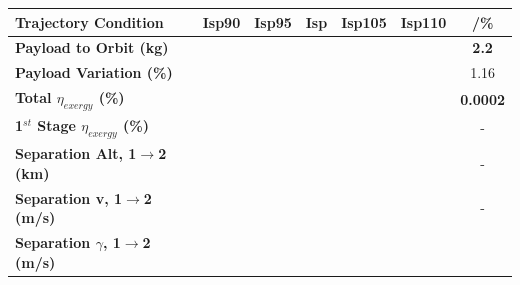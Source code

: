 \begin{table}[ht!]
	\centering
	\begin{tabular}{l c c c c c c} 
		\hline \textbf{Trajectory Condition}
		&Isp90
		&Isp95
		&Isp
		&Isp105
		&Isp110
		& /\%
		\\
		\hline \textbf{Payload to Orbit (kg)}
		& \textbf{\PayloadToOrbitIspNinetyNoReturn}
		& \textbf{\PayloadToOrbitIspNinetyFiveNoReturn}
		& \textbf{\PayloadToOrbitIspStandardNoReturn}
		& \textbf{\PayloadToOrbitIspOneHundredFiveNoReturn}
		& \textbf{\PayloadToOrbitIspOneHundredTenNoReturn}
		&\textbf{2.2}
		\\
		\textbf{Payload Variation (\%)}
		& \PayloadVarIspNinetyNoReturn
		& \PayloadVarIspNinetyFiveNoReturn
		& \PayloadVarIspStandardNoReturn
		& \PayloadVarIspOneHundredFiveNoReturn
		& \PayloadVarIspOneHundredTenNoReturn
		&1.16
		\\
		\textbf{Total $\eta_{exergy}$ (\%)}
		& \textbf{\totalExergyEffIspNinetyNoReturn}
		& \textbf{\totalExergyEffIspNinetyFiveNoReturn}
		& \textbf{\totalExergyEffIspStandardNoReturn}
		& \textbf{\totalExergyEffIspOneHundredFiveNoReturn}
		& \textbf{\totalExergyEffIspOneHundredTenNoReturn}
		& \textbf{0.0002}
		\\
		\hline 
		\textbf{1$^{st}$ Stage $\eta_{exergy}$ (\%)}
		& \textbf{\firstExergyEffIspNinetyNoReturn}
		& \textbf{\firstExergyEffIspNinetyFiveNoReturn}
		& \textbf{\firstExergyEffIspStandardNoReturn}
		& \textbf{\firstExergyEffIspOneHundredFiveNoReturn}
		& \textbf{\firstExergyEffIspOneHundredTenNoReturn}
		& -
		\\
		\textbf{Separation Alt, 1$\rightarrow$2 (km)}
		& \firstsecondSeparationAltIspNinetyNoReturn
		& \firstsecondSeparationAltIspNinetyFiveNoReturn
		& \firstsecondSeparationAltIspStandardNoReturn
		& \firstsecondSeparationAltIspOneHundredFiveNoReturn
		& \firstsecondSeparationAltIspOneHundredTenNoReturn
		& -
		\\
		\textbf{Separation v, 1$\rightarrow$2 (m/s)}
		& \firstsecondSeparationvIspNinetyNoReturn
		& \firstsecondSeparationvIspNinetyFiveNoReturn
		& \firstsecondSeparationvIspStandardNoReturn
		& \firstsecondSeparationvIspOneHundredFiveNoReturn
		& \firstsecondSeparationvIspOneHundredTenNoReturn
		& -
		\\
		\textbf{Separation $\gamma$, 1$\rightarrow$2 (m/s)}
		& \firstsecondSeparationgammaIspNinetyNoReturn
		& \firstsecondSeparationgammaIspNinetyFiveNoReturn
		& \firstsecondSeparationgammaIspStandardNoReturn
		& \firstsecondSeparationgammaIspOneHundredFiveNoReturn
		& \firstsecondSeparationgammaIspOneHundredTenNoReturn

\end{tabular}
\end{table}
